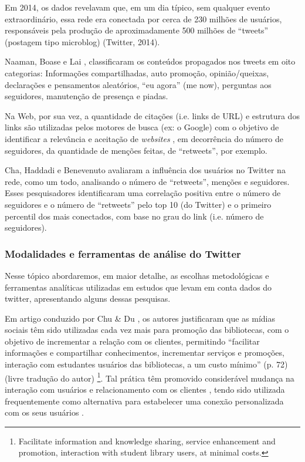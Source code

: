 Em 2014, os dados revelavam que, em um dia típico, sem qualquer evento extraordinário, essa rede era conectada por cerca de 230 milhões de usuários, responsáveis pela produção de aproximadamente 500 milhões de ``tweets'' (postagem tipo microblog) (Twitter, 2014).

Naaman, Boase e Lai \cite{naaman2010really}, classificaram os   conteúdos propagados nos tweets em oito categorias: Informações compartilhadas, auto promoção, opinião/queixas, declarações e pensamentos aleatórios, ``eu agora'' (me now), perguntas aos seguidores, manutenção de presença e piadas. 

Na Web, por sua vez, a quantidade de citações (i.e. links de URL) e estrutura dos links são utilizadas pelos motores de busca (ex: o Google) com o objetivo de identificar a relevância e aceitação de \textit{websites} \cite{brin1998anatomy}, em decorrência do número de seguidores, da quantidade de menções feitas, de ``retweets'', por exemplo.

Cha, Haddadi e Benevenuto \cite{cha2010measuring} avaliaram a influência dos usuários no Twitter na rede, como um todo, analisando o número de ``retweets'', menções e seguidores. Esses pesquisadores identificaram uma correlação positiva entre o número de seguidores e o número de ``retweets'' pelo top 10 (do Twitter) e o primeiro percentil dos mais conectados, com base no grau do link (i.e. número de seguidores). 


\subsubsection{Modalidades e ferramentas de análise do Twitter} 

Nesse tópico abordaremos, em maior detalhe, as escolhas metodológicas e ferramentas analíticas utilizadas em estudos que levam em conta dados do twitter, apresentando alguns dessas pesquisas.

Em artigo conduzido por Chu \& Du \cite{Chu2012}, os autores justificaram que as mídias sociais têm sido utilizadas cada vez mais para promoção das bibliotecas, com o objetivo de incrementar a relação com os clientes, permitindo “facilitar informações e compartilhar conhecimentos, incrementar serviços e promoções, interação com estudantes usuários das bibliotecas, a um custo mínimo” (p. 72) (livre tradução do autor) \footnote{Facilitate information and knowledge sharing, service enhancement and promotion, interaction with student library users, at minimal costs.}. Tal prática têm promovido considerável mudança na interação com usuários e relacionamento com os clientes \cite{del2012libraries}, tendo sido utilizada frequentemente como alternativa para estabelecer uma conexão personalizada com os seus usuários \cite{boateng2014web}. 

